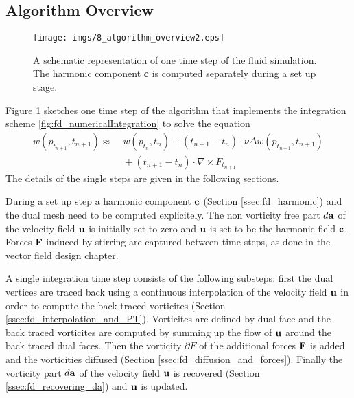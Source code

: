 \subsection{Algorithm Overview}

\begin{figure}%
\begin{center}
\texttt{[image: imgs/8\_algorithm\_overview2.eps]}%
\end{center}
\caption{A schematic representation of one time step of the fluid simulation. The harmonic component \textbf{c} is computed separately during a set up stage.}%
\label{fig:fd_algorithm}%
\end{figure}

Figure \ref{fig:fd_algorithm} sketches one time step of the algorithm that implements the integration scheme \ref{fig:fd_numericalIntegration} to solve the equation 
\begin{align*}w(p_{t_{n+1}},t_{n+1}) \approx \;& w(p_{t_n},t_n) + (t_{n+1}-t_n) \cdot \nu \Delta w(p_{t_{n+1}},t_{n+1}) \nonumber \\ &{}+ (t_{n+1}-t_n) \cdot\nabla \times F_{t_{n+1}}\end{align*}
The details of the single steps are given in the following sections.

During a set up step a harmonic component $\textbf{c}$ (Section \ref{ssec:fd_harmonic}) and the dual mesh need to be computed explicitely. The non vorticity free part $d\textbf{a}$ of the velocity field $\textbf{u}$ is initially set to zero and $\textbf{u}$ is set to be the harmonic field $\textbf{c}$. Forces $\textbf{F}$ induced by stirring are captured between time steps, as done in the vector field design chapter.

A single integration time step consists of the following substeps: first the dual vertices are traced back using a continuous interpolation of the velocity field $\textbf{u}$ in order to compute the back traced vorticites (Section \ref{ssec:fd_interpolation_and_PT}). Vorticites are defined by dual face and the back traced vorticites are computed by summing up the flow of $\textbf{u}$ around the back traced dual faces. Then the vorticity $\partial F$ of the additional forces $\textbf{F}$ is added and the vorticities diffused (Section \ref{ssec:fd_diffusion_and_forces}). Finally the vorticity part $d\textbf{a}$ of the velocity field $\textbf{u}$ is recovered (Section \ref{ssec:fd_recovering_da}) and $\textbf{u}$ is updated.

